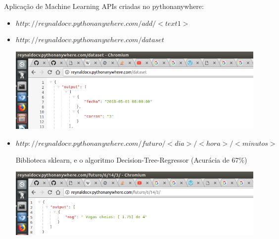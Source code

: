 \documentclass{beamer}
\begin{document}
\begin{frame}{Aplicação de Machine Learning}
APIs criadas no pythonanywhere:
\begin{itemize}\tiny
 \item $http://reynaldocv.pythonanywhere.com/add/<text1>$
 \item $http://reynaldocv.pythonanywhere.com/dataset$
 
 \includegraphics[width=.8\textwidth]{img/paw_dataset.png}
 
 \item $http://reynaldocv.pythonanywhere.com/futuro/<dia>/<hora>/<minutos>$
 
 
 Biblioteca sklearn, e o algoritmo Decision-Tree-Regressor (Acurácia de 67\%)
 
 \includegraphics[width=.8\textwidth]{img/paw_futuro.png}
 
 
\end{itemize}
\end{frame}
\end{document}

